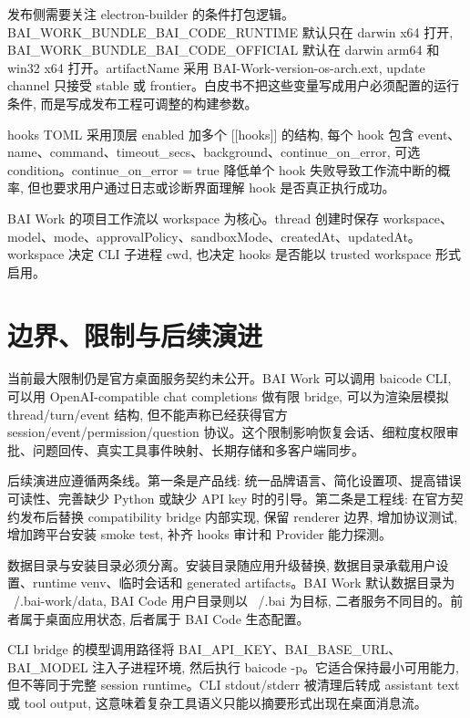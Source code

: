 发布侧需要关注 electron-builder 的条件打包逻辑。BAI\_WORK\_BUNDLE\_BAI\_CODE\_RUNTIME 默认只在 darwin x64 打开, BAI\_WORK\_BUNDLE\_BAI\_CODE\_OFFICIAL 默认在 darwin arm64 和 win32 x64 打开。artifactName 采用 BAI-Work-{version}-{os}-{arch}.{ext}, update channel 只接受 stable 或 frontier。白皮书不把这些变量写成用户必须配置的运行条件, 而是写成发布工程可调整的构建参数。

hooks TOML 采用顶层 enabled 加多个 [[hooks]] 的结构, 每个 hook 包含 event、name、command、timeout\_secs、background、continue\_on\_error, 可选 condition。continue\_on\_error = true 降低单个 hook 失败导致工作流中断的概率, 但也要求用户通过日志或诊断界面理解 hook 是否真正执行成功。

BAI Work 的项目工作流以 workspace 为核心。thread 创建时保存 workspace、model、mode、approvalPolicy、sandboxMode、createdAt、updatedAt。workspace 决定 CLI 子进程 cwd, 也决定 hooks 是否能以 trusted workspace 形式启用。

\section{边界、限制与后续演进}
当前最大限制仍是官方桌面服务契约未公开。BAI Work 可以调用 baicode CLI, 可以用 OpenAI-compatible chat completions 做有限 bridge, 可以为渲染层模拟 thread/turn/event 结构, 但不能声称已经获得官方 session/event/permission/question 协议。这个限制影响恢复会话、细粒度权限审批、问题回传、真实工具事件映射、长期存储和多客户端同步。

后续演进应遵循两条线。第一条是产品线: 统一品牌语言、简化设置项、提高错误可读性、完善缺少 Python 或缺少 API key 时的引导。第二条是工程线: 在官方契约发布后替换 compatibility bridge 内部实现, 保留 renderer 边界, 增加协议测试, 增加跨平台安装 smoke test, 补齐 hooks 审计和 Provider 能力探测。

数据目录与安装目录必须分离。安装目录随应用升级替换, 数据目录承载用户设置、runtime venv、临时会话和 generated artifacts。BAI Work 默认数据目录为 ~/.bai-work/data, BAI Code 用户目录则以 ~/.bai 为目标, 二者服务不同目的。前者属于桌面应用状态, 后者属于 BAI Code 生态配置。

CLI bridge 的模型调用路径将 BAI\_API\_KEY、BAI\_BASE\_URL、BAI\_MODEL 注入子进程环境, 然后执行 baicode -p。它适合保持最小可用能力, 但不等同于完整 session runtime。CLI stdout/stderr 被清理后转成 assistant text 或 tool output, 这意味着复杂工具语义只能以摘要形式出现在桌面消息流。

